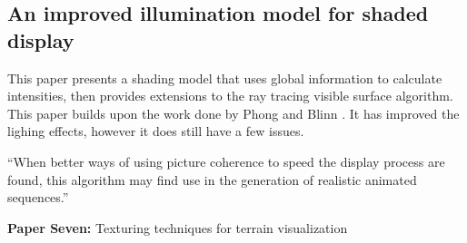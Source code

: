 \documentclass{scrartcl}
\begin{document}



\subsection{An improved illumination model for shaded display \cite{whitted2005improved}}

This paper presents a shading model that uses global information to calculate intensities, then provides extensions to the ray tracing visible surface algorithm. 
This paper builds upon the work done by Phong \cite{phong1975illumination} and Blinn \cite{Blinn1977}. It has improved the lighing effects, however it does still have a few issues.

``When better ways of using picture coherence
to speed the display process are found, this algorithm
may find use in the generation of realistic animated
sequences.''




\par

\textbf{Paper Seven:}
Texturing techniques for terrain visualization
\cite{dollner2000texturing}
\par


\par




\end{document}
